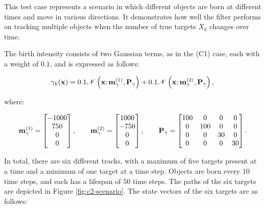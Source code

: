 This test case represents a scenario in which different objects are born at different times and move in various directions. It demonstrates how well the filter performs on tracking multiple objects when the number of true targets $X_k$ changes over time.

The birth intensity consists of two Gaussian terms, as in the (C1) case, each with a weight of $0.1$, and is expressed as follows:

\begin{equation}\label{eq:c2-birth}
    \gamma_k(\mathbf{x}) = 0.1 \mathscr{N}\left( \mathbf{x}; \svecat{m}{\gamma}{(1)}, \vecat{P}{\gamma} \right)
        + 0.1 \mathscr{N}\left( \mathbf{x}; \svecat{m}{\gamma}{(2)}, \vecat{P}{\gamma} \right),
\end{equation}

\noindent where:

\begin{equation}\label{eq:c2-birth-means}
    \svecat{m}{\gamma}{(1)} = \begin{bmatrix}
        -1000 \\
        750 \\
        0 \\
        0 \\
    \end{bmatrix},
    \qquad
    \svecat{m}{\gamma}{(2)} = \begin{bmatrix}
        1000 \\
        -750 \\
        0 \\
        0 \\
    \end{bmatrix},
    \qquad
    \vecat{P}{\gamma} = \begin{bmatrix}
        100 & 0     & 0     & 0     \\
        0   & 100   & 0     & 0     \\
        0   & 0     & 30    & 0     \\
        0   & 0     & 0     & 30    \\
    \end{bmatrix}.
\end{equation}

In total, there are six different tracks, with a maximum of five targets present at a time and a minimum of one target at a time step. Objects are born every $10$ time steps, and each has a lifespan of $50$ time steps. The paths of the six targets are depicted in Figure \ref{fig:c2-scenario}. The state vectors of the six targets are as follows:


